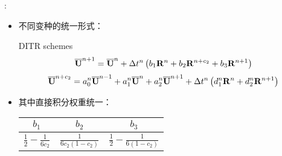 \documentclass[aspectratio=169,serif]{beamer} %
\begin{document}
\begin{frame}{\secname: \subsecname}
  \begin{itemize}
    \item 不同变种的统一形式：
          \begin{block}{DITR schemes}
            \begin{equation}
              \overline{\mathbf{U}}^{n+1} = \overline{\mathbf{U}}^{n} + {\Delta} t^n\left(
              b_1 \mathbf{R}^n +
              b_2 \mathbf{R}^{n+c_2} +
              b_3 \mathbf{R}^{n+1}
              \right)
              \label{eq:DISum}
            \end{equation}
            \begin{equation}
              \label{eq:TRSum}
              \overline{\mathbf{U}}^{n+c_2}  =
              a^n_0\overline{\mathbf{U}}^{n - 1} +
              a^n_1\overline{\mathbf{U}}^{n} +
              a^n_2\overline{\mathbf{U}}^{n + 1}
              +
              {\Delta} t^n
              \left(
              d^n_1\mathbf{R}^{n} +
              d^n_2\mathbf{R}^{n + 1}
              \right)
            \end{equation}
          \end{block}
    \item 其中直接积分权重统一：
          \begin{table}[htbp]
            \centering
            \begin{tabular}{|c|c|c|}
              \hline
              $b_1$                            & $b_2$ & $b_3$ \\
              \hline
              $\frac{1}{2} - \frac{1}{6{c_2}}$ &
              $\frac{1}{6{c_2}(1-{c_2})}$      &
              $\frac{1}{2} - \frac{1}{6(1-{c_2})} $            \\
              \hline
            \end{tabular}
            \label{tab:integ0Tab}
          \end{table}
  \end{itemize}
\end{frame}
\end{document}
